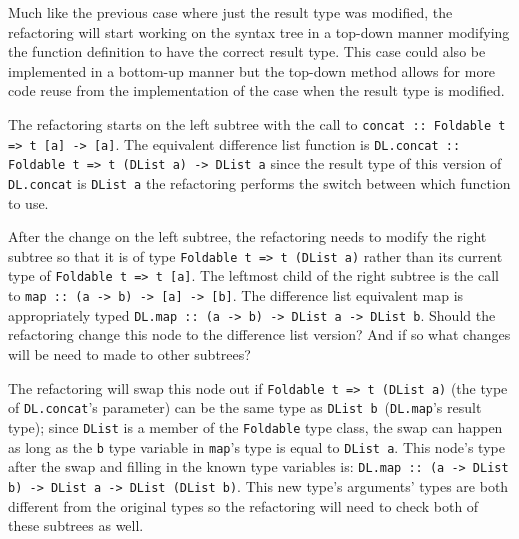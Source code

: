 Much like the previous case where just the result type was modified, the refactoring will start working on the syntax tree in a top-down manner modifying the function definition to have the correct result type. This case could also be implemented in a bottom-up manner but the top-down method allows for more code reuse from the implementation of the case when the result type is modified.

The refactoring starts on the left subtree with the call to \texttt{concat :: Foldable t => t [a] -> [a]}. The equivalent difference list function is \texttt{DL.concat :: Foldable t => t (DList a) -> DList a} since the result type of this version of \texttt{DL.concat} is \texttt{DList a} the refactoring performs the switch between which function to use. 

After the change on the left subtree, the refactoring needs to modify the right subtree so that it is of type \texttt{Foldable t => t (DList a)} rather than its current type of \texttt{Foldable t => t [a]}. The leftmost child of the right subtree is the call to \texttt{map :: (a -> b) -> [a] -> [b]}. The difference list equivalent map is appropriately typed \texttt{DL.map :: (a -> b) -> DList a -> DList b}. Should the refactoring change this node to the difference list version? And if so what changes will be need to made to other subtrees?

The refactoring will swap this node out if \texttt{Foldable t => t (DList a)} (the type of \texttt{DL.concat}'s parameter) can be the same type as \texttt{DList b}~(\texttt{DL.map}'s result type); since \texttt{DList} is a member of the \texttt{Foldable} type class, the swap can happen as long as the \texttt{b} type variable in \texttt{map}'s type is equal to \texttt{DList a}. This node's type after the swap and filling in the known type variables is: \texttt{DL.map :: (a -> DList b) -> DList a -> DList (DList b)}. This new type's arguments' types are both different from the original types so the refactoring will need to check both of these subtrees as well. 

